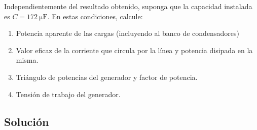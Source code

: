 \documentclass[10pt]{article}
\begin{document}
Independientemente del resultado obtenido, suponga que la capacidad instalada es $C = \SI{172}{\micro\farad}$. En estas condiciones, calcule:
\begin{enumerate}[resume]
\item Potencia aparente de las cargas (incluyendo al banco de condensadores)
\item Valor eficaz de la corriente que circula por la línea y potencia disipada en la misma.
\item Triángulo de potencias del generador y factor de potencia.
\item Tensión de trabajo del generador.
\end{enumerate}

\subsection*{Solución}
\end{document}
